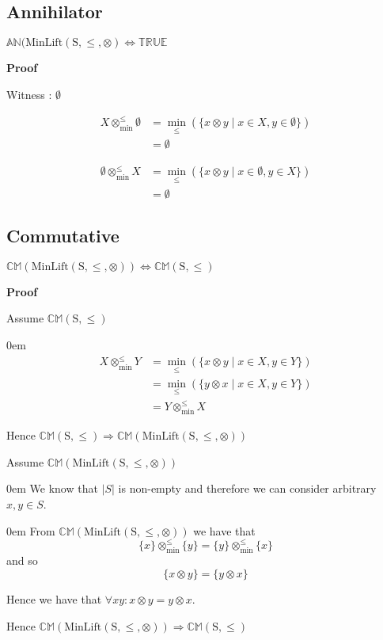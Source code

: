 \documentclass[10pt]{article}
\newcommand{\propname}[1]{{\mathbb{#1}}}
\newcommand{\minlift}{\otimes_{\min}^{\leq}}
\newcommand{\proof}{\vspace{1em} \textbf{Proof} \vspace{1em}}
\newenvironment{ind}[0]{\begin{addmargin}[1em]{0em}\vspace{0.5em}}{\end{addmargin}\vspace{0.5em}}
\begin{document}
\subsection{Annihilator}

$\propname{AN}(\mathrm{MinLift(S,\leq,\otimes)} \Leftrightarrow \propname{TRUE}$

\proof

Witness : $\emptyset$

\begin{align*}
X \minlift \emptyset 	& = \min_\leq(\{ x \otimes y \mid x \in X, y \in \emptyset\}) \\
						& = \emptyset
\end{align*}

\begin{align*}
\emptyset \minlift X 	& = \min_\leq(\{ x \otimes y \mid x \in \emptyset, y \in X\}) \\
						& = \emptyset
\end{align*}

\subsection{Commutative}

$\propname{CM}(\mathrm{MinLift(S,\leq,\otimes)}) \Leftrightarrow \propname{CM}\mathrm{(S,\leq)}$

\proof

Assume $\propname{CM}\mathrm{(S,\leq)}$

\begin{ind}
\begin{align*}
X \minlift Y 	& = \min_\leq(\{x \otimes y \mid x \in X, y \in Y\}) \\
				& = \min_\leq(\{y \otimes x \mid x \in X, y \in Y\}) \\
				& = Y \minlift X
\end{align*}
\end{ind}

Hence $\propname{CM}\mathrm{(S,\leq)} \Rightarrow \propname{CM}(\mathrm{MinLift(S,\leq,\otimes)})$

\vspace{2em}

Assume $\propname{CM}(\mathrm{MinLift(S,\leq,\otimes)})$

\begin{ind}
We know that $|S|$ is non-empty and therefore we can consider arbitrary $x, y \in S$. 
\begin{ind}
From $\propname{CM}(\mathrm{MinLift(S,\leq,\otimes)})$ we have that
\begin{equation*}
\{ x \} \minlift \{ y \} = \{ y \} \minlift \{ x \}
\end{equation*}
and so
\begin{equation*}
\{x \otimes y\} = \{ y \otimes x \}
\end{equation*}
\end{ind}
Hence we have that $\forall x y : x \otimes y = y \otimes x$.
\end{ind}
Hence $\propname{CM}(\mathrm{MinLift(S,\leq,\otimes)}) \Rightarrow \propname{CM}\mathrm{(S,\leq)}$
\end{document}
